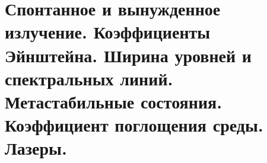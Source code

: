 \chapter{Спонтанное и вынужденное излучение. Коэффициенты Эйнштейна. 
Ширина уровней и спектральных линий. Метастабильные состояния. 
Коэффициент поглощения среды. Лазеры.}

\newpage

